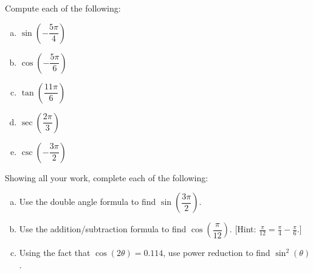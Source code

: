 \documentclass[11pt,letterpaper]{article}
\begin{document}

 Compute each of the following:
	\begin{enumerate}[(a)]
	\item $\sin\left( -\dfrac{5\pi}{4} \right)$
	\item $\cos\left( -\dfrac{5\pi}{6} \right)$
	\item $\tan\left( \dfrac{11\pi}{6} \right)$
	\item $\sec\left( \dfrac{2\pi}{3} \right)$
	\item $\csc\left( -\dfrac{3\pi}{2} \right)$
	\end{enumerate}



\newpage



 Showing all your work, complete each of the following:
	\begin{enumerate}[(a)]
	\item Use the double angle formula to find $\sin\left( \dfrac{3\pi}{2} \right)$. 
	\item Use the addition/subtraction formula to find $\cos\left( \dfrac{\pi}{12} \right)$. [Hint: $\frac{\pi}{12}= \frac{\pi}{4} - \frac{\pi}{6}$.]
	\item Using the fact that $\cos(2\theta)= 0.114$, use power reduction to find $\sin^2(\theta)$. 
	\end{enumerate}
\end{document}
